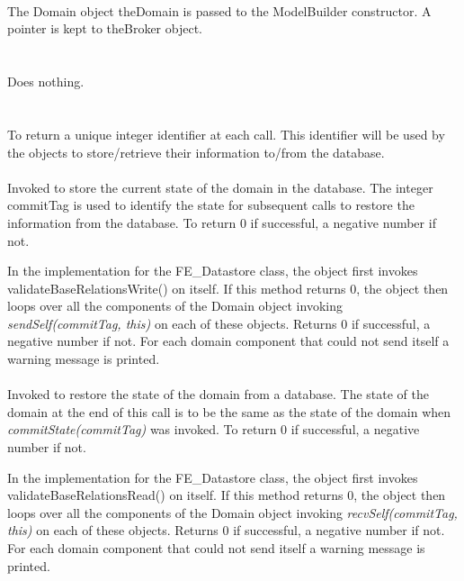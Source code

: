   \\
  \\ \\
The Domain object \p theDomain is passed to the ModelBuilder
constructor. A pointer is kept to \p theBroker object.\\

 \\
\\ 
Does nothing. \\

  \\
\\
To return a unique integer identifier at each call. This identifier
will be used by the objects to store/retrieve their information
to/from the database. \\

\\
Invoked to store the current state of the domain in the database. The
integer \p commitTag is used to identify the state for subsequent
calls to restore the information from the database. To return
$0$ if successful, a negative number if not. 

In the implementation for the FE\_Datastore class, the object first
invokes validateBaseRelationsWrite() on itself. If this method 
returns $0$, the object then loops over all the components of the
Domain object invoking {\em sendSelf(commitTag, this)} on each of
these objects. Returns $0$ if successful, a negative number if
not. For each domain component that could not send itself a warning
message is printed. \\ 

\\
Invoked to restore the state of the domain from a database. The state
of the domain at the end of this call is to be the same as the state
of the domain when {\em commitState(commitTag)} was invoked. To return
$0$ if successful, a negative number if not. 

In the implementation for the FE\_Datastore class, the object first
invokes validateBaseRelationsRead() on itself. If this method 
returns $0$, the object then loops over all the components of the
Domain object invoking {\em recvSelf(commitTag, this)} on each of
these objects. Returns $0$ if successful, a negative number if
not. For each domain component that could not send itself a warning
message is printed. \\ 


